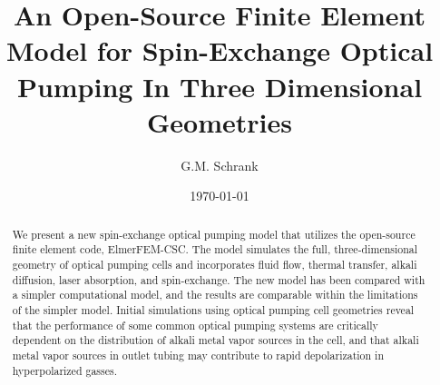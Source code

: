 \documentclass[%
reprint,
 amsmath,amssymb,
 aps,
pra,
floatfix,
]{revtex4-1}
\begin{document}

\title{An Open-Source Finite Element Model for Spin-Exchange Optical Pumping In Three Dimensional Geometries}%

\author{G.M. Schrank}




\date{\today}%

\begin{abstract}
We present a new spin-exchange optical pumping model that utilizes the open-source finite element code, ElmerFEM-CSC. The model simulates the full, three-dimensional geometry of optical pumping cells and incorporates fluid flow, thermal transfer, alkali diffusion, laser absorption, and spin-exchange. The new model has been compared with a simpler computational model, and the results are comparable within the limitations of the simpler model. Initial simulations using optical pumping cell geometries reveal that the performance of some common optical pumping systems are critically dependent on the distribution of alkali metal vapor sources in the cell, and that alkali metal vapor sources in outlet tubing may contribute to rapid depolarization in hyperpolarized gasses. 
\end{abstract}
\end{document}
